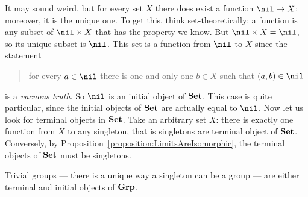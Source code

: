 \begin{example}
It may sound weird, but for every set \(X\) there does exist a function \(\nil \to X\); moreover, it is the unique one. To get this, think set-theoretically: a function is any subset of \(\nil \times X\) that has the property we know. But \(\nil \times X = \nil\), so its unique subset is \(\nil\). This set is a function from \(\nil\) to \(X\) since the statement
\begin{quotation}
for every \(a \in \nil\) there is one and only one \(b \in X\) such that \((a, b) \in \nil\)
\end{quotation}
is a {\em vacuous truth}.
So \(\nil\) is an initial object of \(\mathbf{Set}\). This case is quite particular, since the initial objects of \(\mathbf{Set}\) are actually equal to \(\nil\). \newline
Now let us look for terminal objects in \(\mathbf{Set}\). Take an arbitrary set \(X\): there is exactly one function from \(X\) to any singleton, that is singletons are terminal object of \(\mathbf{Set}\). Conversely, by Proposition~\ref{proposition:LimitsAreIsomorphic}, the terminal objects of \(\mathbf{Set}\) must be singletons.
\end{example}

\begin{exercise}
Trivial groups --- there is a unique way a singleton can be a group --- are either terminal and initial objects of \(\mathbf{Grp}\).
\end{exercise}


